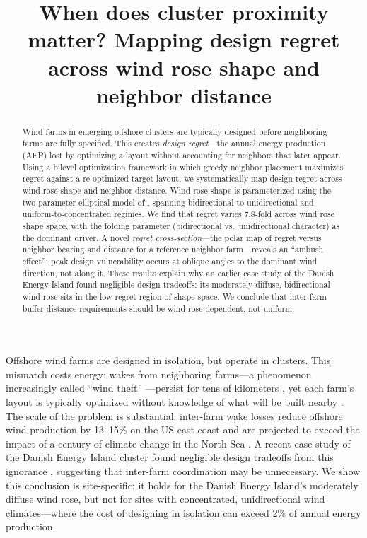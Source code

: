 \documentclass[manuscript, 12pt]{copernicus}
\title{When does cluster proximity matter? Mapping design regret across wind rose shape and neighbor distance}
\affil[1]{Technical University of Denmark, Department of Wind and Energy Systems, Roskilde, Denmark}
\begin{document}
\maketitle

\begin{abstract}
Wind farms in emerging offshore clusters are typically designed before neighboring farms are fully specified.
This creates \emph{design regret}---the annual energy production (AEP) lost by optimizing a layout without accounting for neighbors that later appear.
Using a bilevel optimization framework in which greedy neighbor placement maximizes regret against a re-optimized target layout, we systematically map design regret across wind rose shape and neighbor distance.
Wind rose shape is parameterized using the two-parameter elliptical model of \citet{Hart2025}, spanning bidirectional-to-unidirectional and uniform-to-concentrated regimes.
We find that regret varies 7.8-fold across wind rose shape space, with the folding parameter (bidirectional vs.\ unidirectional character) as the dominant driver.
A novel \emph{regret cross-section}---the polar map of regret versus neighbor bearing and distance for a reference neighbor farm---reveals an ``ambush effect'': peak design vulnerability occurs at oblique angles to the dominant wind direction, not along it.
These results explain why an earlier case study of the Danish Energy Island found negligible design tradeoffs: its moderately diffuse, bidirectional wind rose sits in the low-regret region of shape space.
We conclude that inter-farm buffer distance requirements should be wind-rose-dependent, not uniform.
\end{abstract}

\introduction

Offshore wind farms are designed in isolation, but operate in clusters.
This mismatch costs energy: wakes from neighboring farms---a phenomenon increasingly called ``wind theft'' \citep{Finseraas2024, Du2026}---persist for tens of kilometers \citep{Platis2018, Schneemann2020, Canadillas2022}, yet each farm's layout is typically optimized without knowledge of what will be built nearby \citep{Quick2026omae}.
The scale of the problem is substantial: inter-farm wake losses reduce offshore wind production by 13--15\% on the US east coast \citep{Rosencrans2024} and are projected to exceed the impact of a century of climate change in the North Sea \citep{Warder2025}.
A recent case study of the Danish Energy Island cluster found negligible design tradeoffs from this ignorance \citep{Quick2026omae}, suggesting that inter-farm coordination may be unnecessary.
We show this conclusion is site-specific: it holds for the Danish Energy Island's moderately diffuse wind rose, but not for sites with concentrated, unidirectional wind climates---where the cost of designing in isolation can exceed 2\% of annual energy production.
\end{document}

